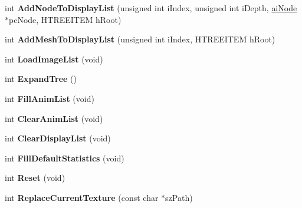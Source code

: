 \begin{DoxyCompactItemize}
\item 
\hypertarget{class_c_display_a4f747b3c641dca332b3a9f4b0525dc89}{int {\bfseries Add\+Node\+To\+Display\+List} (unsigned int i\+Index, unsigned int i\+Depth, \hyperlink{structai_node}{ai\+Node} $\ast$pc\+Node, H\+T\+R\+E\+E\+I\+T\+E\+M h\+Root)}\label{class_c_display_a4f747b3c641dca332b3a9f4b0525dc89}

\item 
\hypertarget{class_c_display_a2cd1558c65117e28064ff585a8e019ad}{int {\bfseries Add\+Mesh\+To\+Display\+List} (unsigned int i\+Index, H\+T\+R\+E\+E\+I\+T\+E\+M h\+Root)}\label{class_c_display_a2cd1558c65117e28064ff585a8e019ad}

\item 
\hypertarget{class_c_display_a84e502ecdded5cc5078730fd9792878b}{int {\bfseries Load\+Image\+List} (void)}\label{class_c_display_a84e502ecdded5cc5078730fd9792878b}

\item 
\hypertarget{class_c_display_aa9a0a38cf938671de067401fd79c8d59}{int {\bfseries Expand\+Tree} ()}\label{class_c_display_aa9a0a38cf938671de067401fd79c8d59}

\item 
\hypertarget{class_c_display_af3f5a0fdfabb1749247c4395473b5bc4}{int {\bfseries Fill\+Anim\+List} (void)}\label{class_c_display_af3f5a0fdfabb1749247c4395473b5bc4}

\item 
\hypertarget{class_c_display_a84919cda877d1c28b16920293a2f49c5}{int {\bfseries Clear\+Anim\+List} (void)}\label{class_c_display_a84919cda877d1c28b16920293a2f49c5}

\item 
\hypertarget{class_c_display_a90c878c3de421c7e340dcc84059b97e1}{int {\bfseries Clear\+Display\+List} (void)}\label{class_c_display_a90c878c3de421c7e340dcc84059b97e1}

\item 
\hypertarget{class_c_display_ab599b1b8f7628ea6f1671b3571411950}{int {\bfseries Fill\+Default\+Statistics} (void)}\label{class_c_display_ab599b1b8f7628ea6f1671b3571411950}

\item 
\hypertarget{class_c_display_a50fef84911a17b04fb3926fa4718ec9d}{int {\bfseries Reset} (void)}\label{class_c_display_a50fef84911a17b04fb3926fa4718ec9d}

\item 
\hypertarget{class_c_display_a5c2c5aa1833c9808ada20b6adc9f9354}{int {\bfseries Replace\+Current\+Texture} (const char $\ast$sz\+Path)}\label{class_c_display_a5c2c5aa1833c9808ada20b6adc9f9354}


\end{DoxyCompactItemize}
